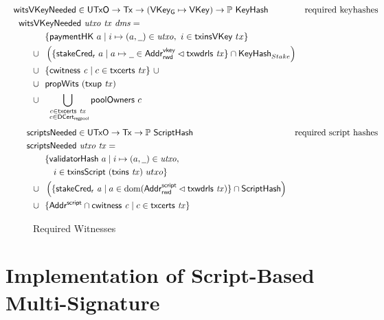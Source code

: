 \documentclass[11pt,a4paper,dvipsnames,twosided]{article}
\newcommand{\Tx}{\type{Tx}}
\newcommand{\UTxO}{\type{UTxO}}
\newcommand{\DCertRegPool}{\type{DCert_{regpool}}}
\newcommand{\AddrRWDVKey}{\type{Addr_{rwd}^{vkey}}}
\newcommand{\AddrRWDScr}{\type{Addr_{rwd}^{script}}}
\newcommand{\AddrScr}{\type{Addr^{script}}}
\newcommand{\HashScr}{\type{ScriptHash}}
\newcommand{\VKey}{\type{VKey}}
\newcommand{\VKeyGen}{\type{VKey_G}}
\newcommand{\KeyHash}{\type{KeyHash}}
\newcommand{\txcerts}[1]{\fun{txcerts}~ \var{#1}}
\newcommand{\cwitness}[1]{\fun{cwitness}~ \var{#1}}
\newcommand{\txwdrls}[1]{\fun{txwdrls}~ \var{#1}}
\newcommand{\wcard}[0]{\underline{\phantom{a}}}
\theoremstyle{definition}
\begin{document}
\begin{figure}[htb]
  \begin{align*}
    & \hspace{-1cm}\fun{witsVKeyNeeded} \in \UTxO \to \Tx \to (\VKeyGen\mapsto\VKey) \to
      \powerset{\KeyHash}
    & \text{required keyhashes} \\
    &  \hspace{-0.8cm}\fun{witsVKeyNeeded}~\var{utxo}~\var{tx}~\var{dms} = \\
    & ~~\{ \fun{paymentHK}~a \mid i \mapsto (a, \wcard) \in \var{utxo},~i\in\fun{txinsVKey}~{tx} \} \\
    \cup & ~~
           \left(\{\fun{stakeCred_r}~a\mid a\mapsto \wcard \in \AddrRWDVKey
      \restrictdom \txwdrls{tx}\} \cap \KeyHash_{Stake}  \right)\\
    \cup & ~~\{\cwitness{c} \mid c \in \txcerts{tx}\}~\cup \\
    \cup & ~~\fun{propWits}~(\fun{txup}~\var{tx}) \\
    \cup & ~~\bigcup_{\substack{c \in \txcerts{tx} \\ ~c \in\DCertRegPool}} \fun{poolOwners}~{c}
  \end{align*}
  \begin{align*}
    & \hspace{-0.5cm}\fun{scriptsNeeded} \in \UTxO \to \Tx \to
      \powerset{\HashScr}
    & \text{required script hashes} \\
    &  \hspace{-0.5cm}\fun{scriptsNeeded}~\var{utxo}~\var{tx} = \\
    & ~~\{ \fun{validatorHash}~a \mid i \mapsto (a, \wcard) \in \var{utxo},\\
    & ~~~~~i\in\fun{txinsScript}~{(\fun{txins~\var{tx}})}~{utxo}\} \\
    \cup & ~~\left(\{ \fun{stakeCred_{r}}~\var{a} \mid a \in \dom (\AddrRWDScr
           \restrictdom \fun{txwdrls}~\var{tx}) \} \cap \HashScr\right) \\
    \cup & ~~\{\AddrScr \cap \fun{cwitness}~\var{c} \mid c \in \fun{txcerts}~\var{tx}\}
  \end{align*}
  \caption{Required Witnesses}
  \label{fig:functions-witnesses}
\end{figure}

\section{Implementation of Script-Based Multi-Signature}
\label{sec:altern-impl}
\end{document}
